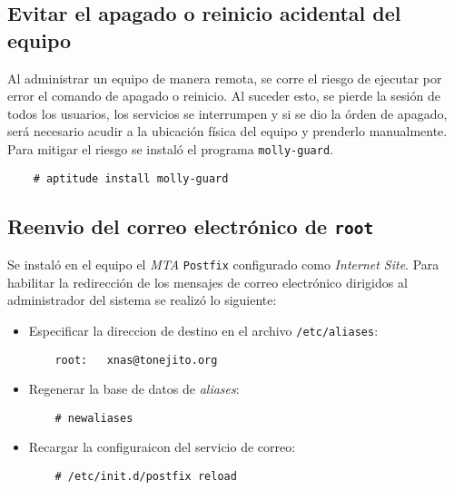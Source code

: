       \subsection {Evitar el apagado o reinicio acidental del equipo}

Al administrar un equipo de manera remota, se corre el riesgo de ejecutar por error el comando de apagado o reinicio. Al suceder esto, se pierde la sesi\'{o}n de todos los usuarios, los servicios se interrumpen y si se dio la \'{o}rden de apagado, ser\'{a} necesario acudir a la ubicaci\'{o}n f\'{i}sica del equipo y prenderlo manualmente. Para mitigar el riesgo se instal\'{o} el programa \texttt{molly-guard}.

{
\scriptsize
\linespread{1}
\begin{verbatim}
    # aptitude install molly-guard
\end{verbatim}
}

      \subsection {Reenvio del correo electr\'{o}nico de \texttt{root}}

Se instal\'{o} en el equipo el \textsl{MTA} \texttt{Postfix} configurado como \textit{Internet Site}. Para habilitar la redirecci\'{o}n de los mensajes de correo electr\'{o}nico dirigidos al administrador del sistema se realiz\'{o} lo siguiente:

\begin{itemize}
  \item Especificar la direccion de destino en el archivo \texttt{/etc/aliases}:

{
\scriptsize
\linespread{1}
\begin{verbatim}
    root:	xnas@tonejito.org
\end{verbatim}
}

  \item Regenerar la base de datos de \textit{aliases}:

{
\scriptsize
\linespread{1}
\begin{verbatim}
    # newaliases
\end{verbatim}
}

  \item Recargar la configuraicon del servicio de correo:

{
\scriptsize
\linespread{1}
\begin{verbatim}
    # /etc/init.d/postfix reload
\end{verbatim}
}

\end{itemize}

